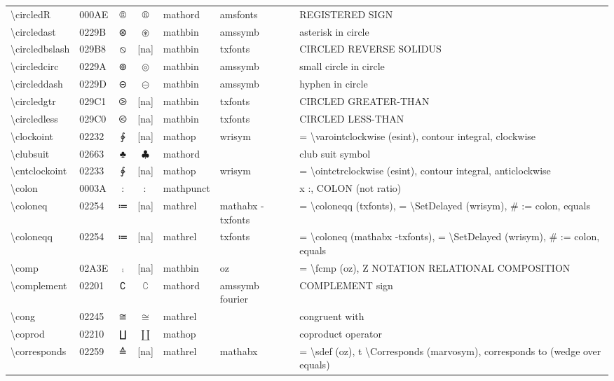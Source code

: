 \documentclass[a4paper,landscape]{article}
\begin{document}
\begin{longtable}{llcclll}
\textbackslash{}circledR & 000AE & ® & $\circledR$ & mathord & amsfonts & REGISTERED SIGN \\
\textbackslash{}circledast & 0229B & ⊛ & $\circledast$ & mathbin & amssymb & asterisk in circle \\
\textbackslash{}circledbslash & 029B8 & ⦸ & [na] & mathbin & txfonts & CIRCLED REVERSE SOLIDUS \\
\textbackslash{}circledcirc & 0229A & ⊚ & $\circledcirc$ & mathbin & amssymb & small circle in circle \\
\textbackslash{}circleddash & 0229D & ⊝ & $\circleddash$ & mathbin & amssymb & hyphen in circle \\
\textbackslash{}circledgtr & 029C1 & ⧁ & [na] & mathbin & txfonts & CIRCLED GREATER-THAN \\
\textbackslash{}circledless & 029C0 & ⧀ & [na] & mathbin & txfonts & CIRCLED LESS-THAN \\
\textbackslash{}clockoint & 02232 & ∲ & [na] & mathop & wrisym & = \textbackslash{}varointclockwise (esint),  contour integral,  clockwise \\
\textbackslash{}clubsuit & 02663 & ♣ & $\clubsuit$ & mathord &  & club suit symbol \\
\textbackslash{}cntclockoint & 02233 & ∳ & [na] & mathop & wrisym & = \textbackslash{}ointctrclockwise (esint),  contour integral,  anticlockwise \\
\textbackslash{}colon & 0003A & : & $\colon$ & mathpunct &  & x :, COLON (not ratio) \\
\textbackslash{}coloneq & 02254 & ≔ & [na] & mathrel & mathabx -txfonts & = \textbackslash{}coloneqq (txfonts), = \textbackslash{}SetDelayed (wrisym), \# := colon, equals \\
\textbackslash{}coloneqq & 02254 & ≔ & [na] & mathrel & txfonts & = \textbackslash{}coloneq (mathabx -txfonts),  = \textbackslash{}SetDelayed (wrisym),  \# := colon,  equals \\
\textbackslash{}comp & 02A3E & ⨾ & [na] & mathbin & oz & = \textbackslash{}fcmp (oz),  Z NOTATION RELATIONAL COMPOSITION \\
\textbackslash{}complement & 02201 & ∁ & $\complement$ & mathord & amssymb fourier & COMPLEMENT sign \\
\textbackslash{}cong & 02245 & ≅ & $\cong$ & mathrel &  & congruent with \\
\textbackslash{}coprod & 02210 & ∐ & $\coprod$ & mathop &  & coproduct operator \\
\textbackslash{}corresponds & 02259 & ≙ & [na] & mathrel & mathabx & = \textbackslash{}sdef (oz), t \textbackslash{}Corresponds (marvosym), corresponds to (wedge over equals) \\

\end{longtable}
\end{document}

